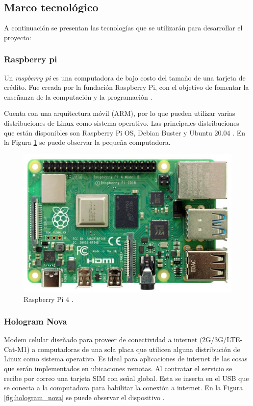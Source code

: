 \subsection{Marco tecnológico}

A continuación se presentan las tecnologías que se utilizarán para desarrollar el proyecto:

\subsubsection{Raspberry pi}
Un \textit{raspberry pi} es una computadora de bajo costo del tamaño de una tarjeta de crédito. Fue creada por la fundación Raspberry Pi, con el objetivo de fomentar la enseñanza de la computación y la programación \cite{what_is_raspberry}.

Cuenta con una arquitectura móvil (ARM), por lo que pueden utilizar varias distribuciones de Linux como sistema operativo. Las principales distribuciones que están disponibles son Raspberry Pi OS, Debian Buster y Ubuntu 20.04 \cite{raspberry_os}. En la Figura \ref{fig:raspberry} se puede observar la pequeña computadora.

\begin{figure}[!ht]
    \centering
    \includegraphics[width=.50\linewidth]{imagenes/raspberry_pi_2.png}
    \caption{Raspberry Pi 4 \cite{what_is_raspberry}.}
    \label{fig:raspberry}
\end{figure}

\subsubsection{Hologram Nova}
Modem celular diseñado para proveer de conectividad a internet (2G/3G/LTE-Cat-M1) a computadoras de una sola placa que utilicen alguna distribución de Linux como sistema operativo. Es ideal para aplicaciones de internet de las cosas que serán implementados en ubicaciones remotas. Al contratar el servicio se recibe por correo una tarjeta SIM con señal global. Esta se inserta en el USB que se conecta a la computadora para habilitar la conexión a internet. En la Figura \ref{fig:hologram_nova} se puede observar el dispositivo \cite{hologram_nova}.

